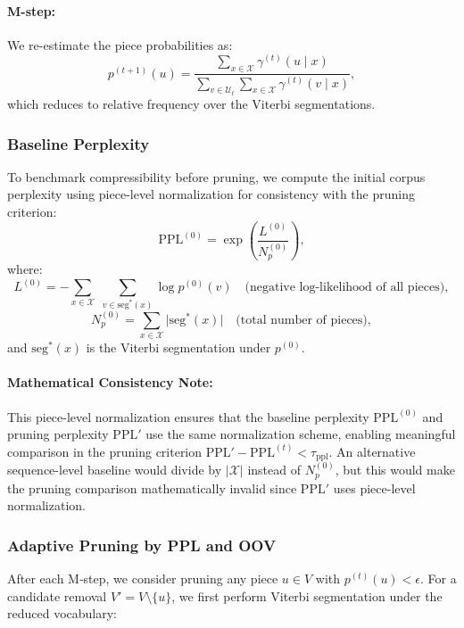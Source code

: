 \paragraph{M-step:}

We re-estimate the piece probabilities as:
\[
p^{(t+1)}(u)
= \frac{
	\sum_{x \in \mathcal X} \gamma^{(t)}(u \mid x)
}{
	\sum_{v \in \mathcal U_t} \sum_{x \in \mathcal X} \gamma^{(t)}(v \mid x)
},
\]
which reduces to relative frequency over the Viterbi segmentations.

\subsubsection{Baseline Perplexity}

To benchmark compressibility before pruning, we compute the initial corpus perplexity using piece-level normalization for consistency with the pruning criterion:
\[
\mathrm{PPL}^{(0)}
= \exp\left(
\frac{L^{(0)}}{N_{p}^{(0)}}
\right),
\]
where:
\[
L^{(0)} = -\sum_{x\in\mathcal X}\;\sum_{v\in\mathrm{seg}^{*}(x)}\log p^{(0)}(v)
\quad\text{(negative log-likelihood of all pieces)},
\]
\[
N_{p}^{(0)} = \sum_{x\in\mathcal X} \bigl|\mathrm{seg}^{*}(x)\bigr|
\quad\text{(total number of pieces)},
\]
and \(\mathrm{seg}^{*}(x)\) is the Viterbi segmentation under \(p^{(0)}\).

\paragraph{Mathematical Consistency Note:} 
This piece-level normalization ensures that the baseline perplexity \(\mathrm{PPL}^{(0)}\) and pruning perplexity \(\mathrm{PPL}'\) use the same normalization scheme, enabling meaningful comparison in the pruning criterion \(\mathrm{PPL}' - \mathrm{PPL}^{(t)} < \tau_{\mathrm{ppl}}\). An alternative sequence-level baseline would divide by \(|\mathcal X|\) instead of \(N_{p}^{(0)}\), but this would make the pruning comparison mathematically invalid since \(\mathrm{PPL}'\) uses piece-level normalization.







\subsubsection{Adaptive Pruning by PPL and OOV}

After each M‐step, we consider pruning any piece \(u\in V\) with \(p^{(t)}(u)<\epsilon\).  For a candidate removal \(V' = V \setminus \{u\}\), we first perform Viterbi segmentation under the reduced vocabulary:

